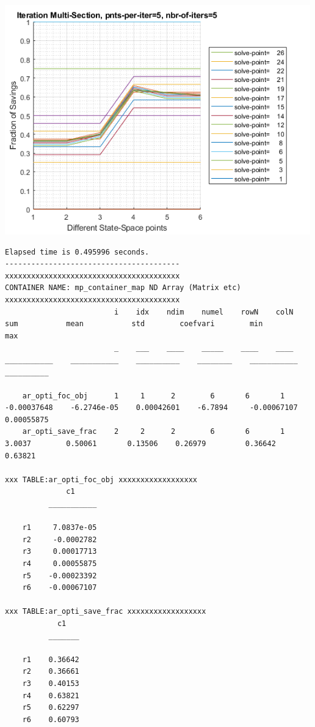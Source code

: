 \documentclass[
]{book}
\begin{document}
\includegraphics[width=5.20833in,height=\textheight]{img/fx_optim_mlsec_savezrone_images/figure_0.png}

\begin{verbatim}
Elapsed time is 0.495996 seconds.
----------------------------------------
xxxxxxxxxxxxxxxxxxxxxxxxxxxxxxxxxxxxxxxx
CONTAINER NAME: mp_container_map ND Array (Matrix etc)
xxxxxxxxxxxxxxxxxxxxxxxxxxxxxxxxxxxxxxxx
                         i    idx    ndim    numel    rowN    colN        sum           mean           std        coefvari        min           max    
                         _    ___    ____    _____    ____    ____    ___________    ___________    __________    ________    ___________    __________

    ar_opti_foc_obj      1     1      2        6       6       1      -0.00037648    -6.2746e-05    0.00042601    -6.7894     -0.00067107    0.00055875
    ar_opti_save_frac    2     2      2        6       6       1           3.0037        0.50061       0.13506    0.26979         0.36642       0.63821

xxx TABLE:ar_opti_foc_obj xxxxxxxxxxxxxxxxxx
              c1     
          ___________

    r1     7.0837e-05
    r2     -0.0002782
    r3     0.00017713
    r4     0.00055875
    r5    -0.00023392
    r6    -0.00067107

xxx TABLE:ar_opti_save_frac xxxxxxxxxxxxxxxxxx
            c1   
          _______

    r1    0.36642
    r2    0.36661
    r3    0.40153
    r4    0.63821
    r5    0.62297
    r6    0.60793
\end{verbatim}
\end{document}
